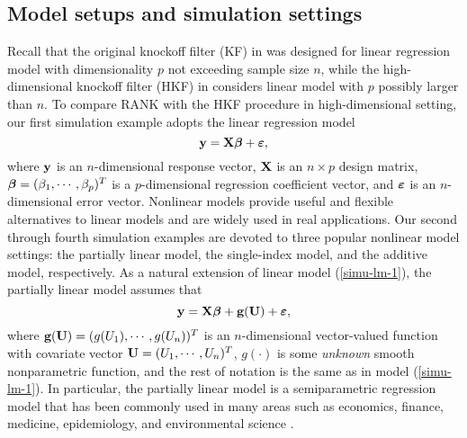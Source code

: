 \documentclass[11pt]{article}
\newcommand{\bg}{\mbox{\bf g}}
\newcommand{\by}{\mbox{\bf y}}
\newcommand{\bU}{\mbox{\bf U}}
\newcommand{\bX}{\mbox{\bf X}}
\newcommand{\bveps}{\mbox{\boldmath $\varepsilon$}}
\newcommand{\bbeta}{\mbox{\boldmath $\beta$}}
\def\t{^T}
\begin{document}
\subsection{Model setups and simulation settings} \label{sec4.1}
Recall that the original knockoff filter (KF) in \cite{BarberCandes2015} was designed for linear regression model with dimensionality $p$ not exceeding sample size $n$, while the high-dimensional knockoff filter (HKF) in \cite{BarberCandes2016} considers linear model with $p$ possibly larger than $n$. To compare RANK with the HKF procedure in high-dimensional setting, %
our first simulation example adopts the linear regression model
\begin{equation} \label{simu-lm-1}
\by = \bX\bbeta + \bveps,
\end{equation}
where $\by$ is an $n$-dimensional response vector, $\bX$ is an $n \times p$ design matrix, $\bbeta = (\beta_1, \cdots, \beta_p)\t$ is a $p$-dimensional regression coefficient vector, and $\bveps$ is an $n$-dimensional error vector. Nonlinear models provide useful and flexible alternatives to linear models and are widely used in real applications. Our second through fourth simulation examples are devoted to three popular nonlinear model settings: the partially linear model, the single-index model, and the additive model, respectively. As a natural extension of linear model (\ref{simu-lm-1}), the partially linear model assumes that
\begin{equation} \label{simu-plm-2}
\by = \bX\bbeta + {\bg}({\bU}) + \bveps,
\end{equation}
where $ {\bg}({\bU})=(g(U_1),\cdots,g(U_n))^T$ is an $n$-dimensional vector-valued function with covariate vector ${\bU} = (U_1, \cdots, U_n)^T$, $g(\cdot)$ is some \textit{unknown} smooth nonparametric function, and the rest of notation is the same as in model (\ref{simu-lm-1}). In particular, the partially linear model is a semiparametric regression model that has been commonly used in many areas such as economics, finance, medicine, epidemiology, and environmental science \cite{Engle1986, Hardle2000}.
\end{document}
